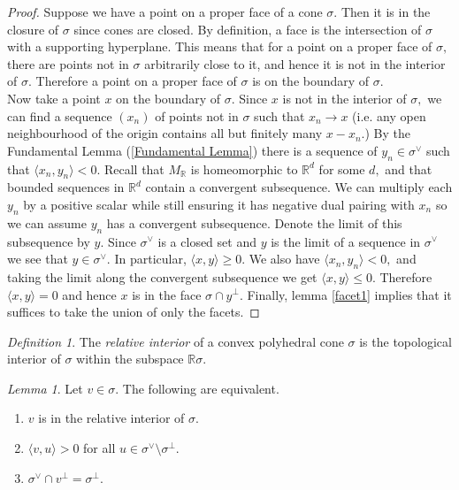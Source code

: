 \documentclass[BSc]{usydthesis}
\numberwithin{equation}{chapter}
\theoremstyle{remark}
\newtheorem{Definition}[equation]{Definition}
\newtheorem{Lemma}[equation]{Lemma}
\newcommand{\R}{\mathbb{R}}
\newcommand{\V}{\vee}
\begin{document}
\begin{proof}
 Suppose we have a point on a proper face of a cone $\sigma.$ Then it is in the closure of $\sigma$ since cones are closed. By definition, a face is the intersection of $\sigma$ with a supporting hyperplane. This means that for a point on a proper face of $\sigma,$ there are points not in $\sigma$ arbitrarily close to it, and hence it is not in the interior of $\sigma.$ Therefore a point on a proper face of $\sigma$ is on the boundary of $\sigma.$ 
 \\
 Now take a point $x$ on the boundary of $\sigma.$ Since $x$ is not in the interior of $\sigma,$ we can find a sequence $(x_n)$ of points not in $\sigma$ such that $x_n \to x$ (i.e. any open neighbourhood of the origin contains all but finitely many $x-x_n.$) By the Fundamental Lemma (\ref{Fundamental Lemma}) there is a sequence of $y_n\in \sigma^{\V} $ such that $\langle x_n, y_n \rangle <0.$ Recall that $M_{\R}$ is homeomorphic to $\R^d$ for some $d,$ and that bounded sequences in $\R^d$ contain a convergent subsequence. We can multiply each $y_n$ by a positive scalar while still ensuring it has negative dual pairing with $x_n$ so we can assume $y_n$ has a convergent subsequence. Denote the limit of this subsequence by $y.$ Since $\sigma^{\V}$ is a closed set and $y$ is the limit of a sequence in $\sigma^{\V}$ we see that $y\in \sigma^{\V}.$ In particular, $\langle x , y \rangle \geq 0.$ We also have $\langle x_n, y_n \rangle <0,$ and taking the limit along the convergent subsequence we get $\langle x, y \rangle \leq 0.$ Therefore $\langle x,y \rangle =0$ and hence $x$ is in the face $\sigma \cap y^{\perp}.$ Finally, lemma \ref{facet1} implies that it suffices to take the union of only the facets. 
\end{proof}

\begin{Definition} The {\em relative interior} of a convex polyhedral cone $\sigma$ is the topological interior of $\sigma$ within the subspace $\R \sigma.$ 
\end{Definition}

\begin{Lemma}\label{Relative}
 Let $v\in \sigma.$ The following are equivalent.
 \begin{enumerate}
  \item $v$ is in the relative interior of $\sigma.$
  \item $\langle v, u \rangle > 0 $ for all $u\in \sigma^{\V}\setminus \sigma^{\perp}.$
  \item $\sigma^{\V} \cap v^{\perp} = \sigma^{\perp}.$
 \end{enumerate}
\end{Lemma}
\end{document}

